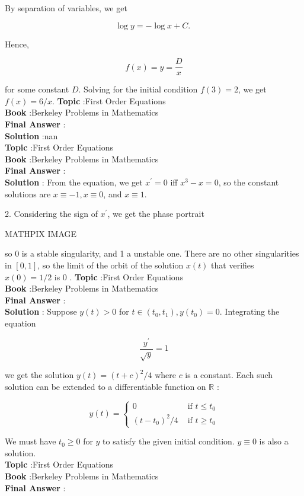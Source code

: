 \documentclass[10pt]{article}
\begin{document}
By separation of variables, we get

$$
\log y=-\log x+C \text {. }
$$

Hence,

$$
f(x)=y=\frac{D}{x}
$$

for some constant $D$. Solving for the initial condition $f(3)=2$, we get $f(x)=6 / x$.
\textbf{Topic} :First Order Equations \\
\textbf{Book} :Berkeley Problems in Mathematics\\
\textbf{Final Answer} :\\


\textbf{Solution} :nan\\
\textbf{Topic} :First Order Equations \\
\textbf{Book} :Berkeley Problems in Mathematics\\
\textbf{Final Answer} :\\


\textbf{Solution} : From the equation, we get $x^{\prime}=0$ iff $x^{3}-x=0$, so the constant solutions are $x \equiv-1, x \equiv 0$, and $x \equiv 1$.

2. Considering the sign of $x^{\prime}$, we get the phase portrait

MATHPIX IMAGE

so 0 is a stable singularity, and 1 a unstable one. There are no other singularities in $[0,1]$, so the limit of the orbit of the solution $x(t)$ that verifies $x(0)=1 / 2$ is 0 .
\textbf{Topic} :First Order Equations \\
\textbf{Book} :Berkeley Problems in Mathematics\\
\textbf{Final Answer} :\\


\textbf{Solution} : Suppose $y(t)>0$ for $t \in\left(t_{0}, t_{1}\right), y\left(t_{0}\right)=0$. Integrating the equation

$$
\frac{y^{\prime}}{\sqrt{y}}=1
$$

we get the solution $y(t)=(t+c)^{2} / 4$ where $c$ is a constant. Each such solution can be extended to a differentiable function on $\mathbb{R}$ :

$$
y(t)= \begin{cases}0 & \text { if } t \leqslant t_{0} \\ \left(t-t_{0}\right)^{2} / 4 & \text { if } t \geqslant t_{0}\end{cases}
$$

We must have $t_{0} \geqslant 0$ for $y$ to satisfy the given initial condition. $y \equiv 0$ is also a solution. \\
\textbf{Topic} :First Order Equations \\
\textbf{Book} :Berkeley Problems in Mathematics\\
\textbf{Final Answer} :\\
\end{document}
